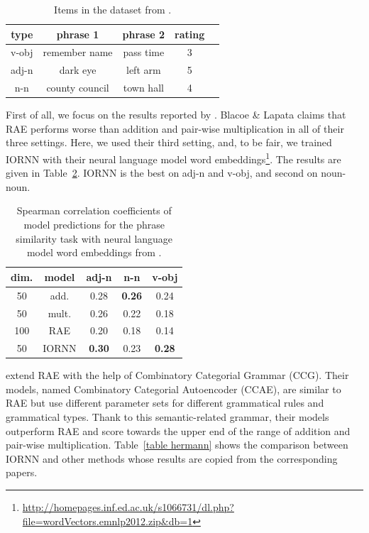 \documentclass[11pt]{article}
\begin{document}
\begin{table}[h!]
	\center
	\begin{tabular}{ccccc}
		type & phrase 1 & phrase 2 & rating \\ \hline 
		v-obj & remember name &  pass time & 3 \\ 
		adj-n & dark eye & left arm & 5 \\ 
		n-n & county council & town hall & 4 \\ \hline
	\end{tabular}
	\caption{Items in the dataset from \cite{mitchell_composition_2010}.}
	\label{table compounds}
\end{table}	

First of all, we focus on the results reported by \cite{blacoe_comparison_2012}. Blacoe \& Lapata 
claims that RAE performs worse than addition and pair-wise multiplication in all of their three settings. 
Here, we used their third setting, and, to be fair, we trained IORNN with their neural language model word embeddings\footnote{\url{http://homepages.inf.ed.ac.uk/s1066731/dl.php?file=wordVectors.emnlp2012.zip&db=1}}.
The results are given in Table~\ref{table blacoe}. IORNN is the best on adj-n and v-obj, and second on noun-noun.
\begin{table}[h!]
	\center
	\begin{tabular}{ccccc}
		dim. & model & adj-n & n-n & v-obj \\ \hline 
		50 & add. & 0.28 & \textbf{0.26} & 0.24 \\ 
		50 & mult. & 0.26 & 0.22 & 0.18 \\ 
		100 & RAE & 0.20 & 0.18 & 0.14 \\ \hline
		50 & IORNN & \textbf{0.30} & 0.23 & \textbf{0.28} \\ \hline
	\end{tabular}
	\caption{Spearman correlation coefficients of model predictions for the phrase similarity task
	with neural language model word embeddings from \cite{blacoe_comparison_2012}.}
	\label{table blacoe}
\end{table}

\cite{hermann2013role} extend RAE with the help of Combinatory Categorial Grammar (CCG). 
Their models, named Combinatory Categorial Autoencoder (CCAE), are similar 
to RAE but use different parameter sets for different grammatical rules and grammatical types. 
Thank to this semantic-related grammar, their models outperform RAE and score towards 
the upper end of the range of addition and pair-wise multiplication. Table~\ref{table hermann}
shows the comparison between IORNN and other methods whose results are copied from 
the corresponding papers. 
\end{document}
